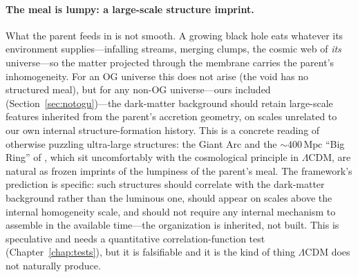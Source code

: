 \paragraph{The meal is lumpy: a large-scale structure imprint.} What the parent
feeds in is not smooth. A growing black hole eats whatever its environment
supplies---infalling streams, merging clumps, the cosmic web of \emph{its}
universe---so the matter projected through the membrane carries the parent's
inhomogeneity. For an OG universe this does not arise (the void has no structured
meal), but for any non-OG universe---ours included
(Section~\ref{sec:notogu})---the dark-matter background should retain large-scale
features inherited from the parent's accretion geometry, on scales unrelated to
our own internal structure-formation history. This is a concrete reading of
otherwise puzzling ultra-large structures: the Giant Arc and the
$\sim\!400\,\mathrm{Mpc}$ ``Big Ring'' of \citet{lopez2024bigring}, which sit
uncomfortably with the cosmological principle in $\Lambda$CDM, are natural as frozen
imprints of the lumpiness of the parent's meal. The framework's prediction is
specific: such structures should correlate with the dark-matter background rather
than the luminous one, should appear on scales above the internal homogeneity
scale, and should not require any internal mechanism to assemble in the available
time---the organization is inherited, not built. This is speculative and
needs a quantitative correlation-function test (Chapter~\ref{chap:tests}), but it
is falsifiable and it is the kind of thing $\Lambda$CDM does not naturally produce.

